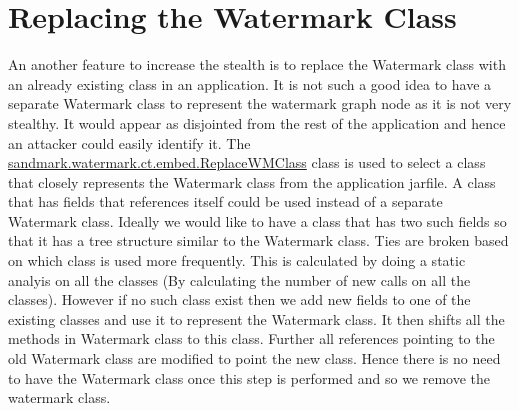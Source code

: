 \section{Replacing the Watermark Class}
An another feature to increase the stealth is to replace the Watermark class with an already existing
class in an application. It is not such a good idea to have a separate Watermark class to represent the watermark graph node as it is not very stealthy. It would appear as disjointed from the rest of the application and hence an attacker could easily identify it.  The \url{sandmark.watermark.ct.embed.ReplaceWMClass} class is used to select a class that closely represents the Watermark class from the application jarfile. A class that has fields that references itself could be used instead of a separate Watermark class. Ideally we would like to have a class that has two such fields so that it has a tree structure similar to the Watermark class. Ties are broken based on which class is used more frequently. This is calculated by doing a static analyis on all the classes (By calculating the number of new calls on all the classes).
  However if no such class exist then we add new fields to one of the existing classes and use it to represent the Watermark class. It then shifts all the methods in Watermark class to this class. Further all references pointing to the old Watermark class are modified to point the new class. Hence there is no need to have the Watermark class once this step is performed and so we remove the watermark class.

